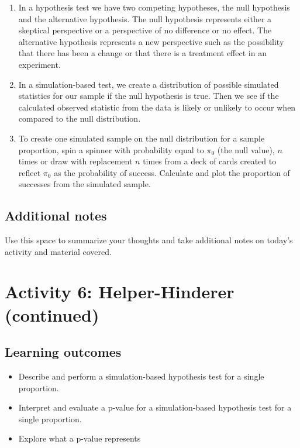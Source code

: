 \documentclass[
]{report}
\begin{document}
\begin{enumerate}
\def\labelenumi{\arabic{enumi}.}
\item
  In a hypothesis test we have two competing hypotheses, the null hypothesis and the alternative hypothesis. The null hypothesis represents either a skeptical perspective or a perspective of no difference or no effect. The alternative hypothesis represents a new perspective such as the possibility that there has been a change or that there is a treatment effect in an experiment.
\item
  In a simulation-based test, we create a distribution of possible simulated statistics for our sample if the null hypothesis is true. Then we see if the calculated observed statistic from the data is likely or unlikely to occur when compared to the null distribution.
\item
  To create one simulated sample on the null distribution for a sample proportion, spin a spinner with probability equal to \(\pi_0\) (the null value), \(n\) times or draw with replacement \(n\) times from a deck of cards created to reflect \(\pi_0\) as the probability of success. Calculate and plot the proportion of successes from the simulated sample.
\end{enumerate}

\hypertarget{additional-notes}{%
\subsection{Additional notes}\label{additional-notes}}

Use this space to summarize your thoughts and take additional notes on today's activity and material covered.

\newpage

\hypertarget{activity-6-helper-hinderer-continued}{%
\section{Activity 6: Helper-Hinderer (continued)}\label{activity-6-helper-hinderer-continued}}


\hypertarget{learning-outcomes-1}{%
\subsection{Learning outcomes}\label{learning-outcomes-1}}

\begin{itemize}
\item
  Describe and perform a simulation-based hypothesis test for a single proportion.
\item
  Interpret and evaluate a p-value for a simulation-based hypothesis test for a single proportion.
\item
  Explore what a p-value represents
\end{itemize}
\end{document}
